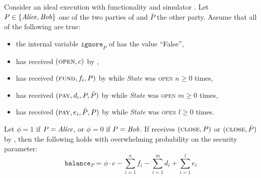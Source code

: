 \begin{lemma}
\label{lemma:ideal-balance}
  Consider an ideal execution with functionality \fchan and simulator
  \simulator. Let $P \in \{\mathit{Alice}, \mathit{Bob}\}$ one of the two parties of \fchan and
  $\bar{P}$ the other party. Assume that all of the following are true:
  \begin{itemize}
    \item the internal variable $\texttt{ignore}_P$ of \fchan has the value
    ``False'',
    \item \fchan has received $(\textsc{open}, c)$ by \simulator,
    \item \fchan has received $(\textsc{fund}, f_i, P)$ by \simulator while
    \textit{State} was \textsc{open} $n \geq 0$ times,
    \item \fchan has received $(\textsc{pay}, d_i, P, \bar{P})$ by \simulator
    while \textit{State} was \textsc{open} $m \geq 0$ times,
    \item \fchan has received $(\textsc{pay}, e_i, \bar{P}, P)$ by \simulator
    while \textit{State} was \textsc{open} $l \geq 0$ times.
  \end{itemize}
  Let $\phi = 1$ if $P = \mathit{Alice}$, or $\phi = 0$ if $P = \mathit{Bob}$. If \fchan
  receives $(\textsc{close}, P)$ or $(\textsc{close}, \bar{P})$ by \simulator,
  then the following holds with overwhelming probability on the security
  parameter:
  \begin{equation}
    \texttt{balance}_P = \phi \cdot c - \sum\limits_{i=1}^n f_i -
    \sum\limits_{i=1}^m d_i + \sum\limits_{i=1}^l e_i
  \end{equation}
\end{lemma}

